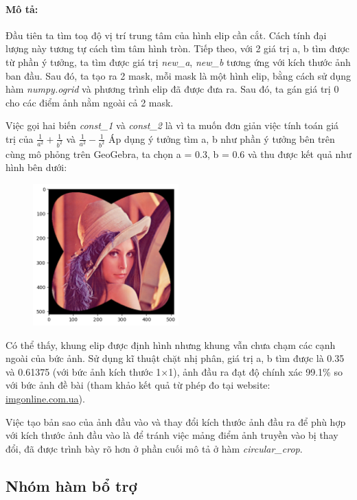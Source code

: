 \documentclass[]{article}
\begin{document}
\paragraph{Mô tả:} Đầu tiên ta tìm toạ độ vị trí trung tâm của hình elip cần cắt. Cách tính đại lượng này tương tự cách tìm tâm hình tròn. Tiếp theo, với 2 giá trị a, b tìm được từ phần ý tưởng, ta tìm được giá trị \textit{new\_a}, \textit{new\_b} tương ứng với kích thước ảnh ban đầu. Sau đó, ta tạo ra 2 mask, mỗi mask là một hình elip, bằng cách sử dụng hàm \textit{numpy.ogrid} và phương trình elip đã được đưa ra. Sau đó, ta gán giá trị 0 cho các điểm ảnh nằm ngoài cả 2 mask. \par
Việc gọi hai biến \textit{const\_1} và \textit{const\_2} là vì ta muốn đơn giản việc tính toán giá trị của $\frac{1}{a^2} + \frac{1}{b^2}$ và $\frac{1}{a^2} - \frac{1}{b^2}$
Áp dụng ý tưởng tìm a, b như phần ý tưởng bên trên cùng mô phỏng trên GeoGebra, ta chọn a = 0.3, b = 0.6 và thu được kết quả như hình bên dưới:
\begin{figure}[!ht]
  \centering
  \includegraphics[width=0.5\textwidth]{image/lenna_03_06.png}
\end{figure} \par
Có thể thấy, khung elip được định hình nhưng khung vẫn chưa chạm các cạnh ngoài của bức ảnh. Sử dụng kĩ thuật chặt nhị phân, giá trị a, b tìm được là 0.35 và 0.61375 (với bức ảnh kích thước 1$\times$1), ảnh đầu ra đạt độ chính xác 99.1\% so với bức ảnh đề bài (tham khảo kết quả từ phép đo tại website: \href{https://www.imgonline.com.ua/eng/similarity-percent.php}{imgonline.com.ua}). \par
Việc tạo bản sao của ảnh đầu vào và thay đổi kích thước ảnh đầu ra để phù hợp với kích thước ảnh đầu vào là để tránh việc mảng điểm ảnh truyền vào bị thay đổi, đã được trình bày rõ hơn ở phần cuối mô tả ở hàm \textit{circular\_crop}.
\subsection{Nhóm hàm bổ trợ}
\end{document}
